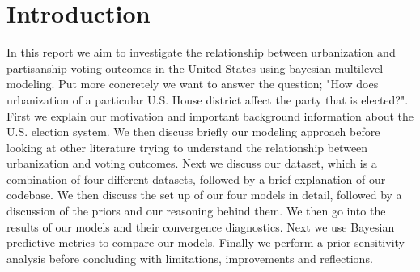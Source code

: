 \documentclass[12pt]{article}
\begin{document}











\thispagestyle{empty} %
\newpage

\tableofcontents
\newpage


\section{Introduction}
 


In this report we aim to investigate the relationship between urbanization and partisanship voting outcomes in the United States using bayesian multilevel modeling. Put more concretely we want to answer the question; "How does urbanization of a particular U.S. House district affect the party that is elected?". First we explain our motivation and important background information about the U.S. election system. 
We then discuss briefly our modeling approach before looking at other literature trying to understand the relationship between urbanization and voting outcomes. 
Next we discuss our dataset, which is a combination of four different datasets, followed by a brief explanation of our codebase. 
We then discuss the set up of our four models in detail, followed by a discussion of the priors and our reasoning behind them. We then go into the results of our models and their convergence diagnostics. Next we use Bayesian predictive metrics to compare our models. Finally we perform a prior sensitivity analysis before concluding with limitations, improvements and reflections. 
\end{document}

